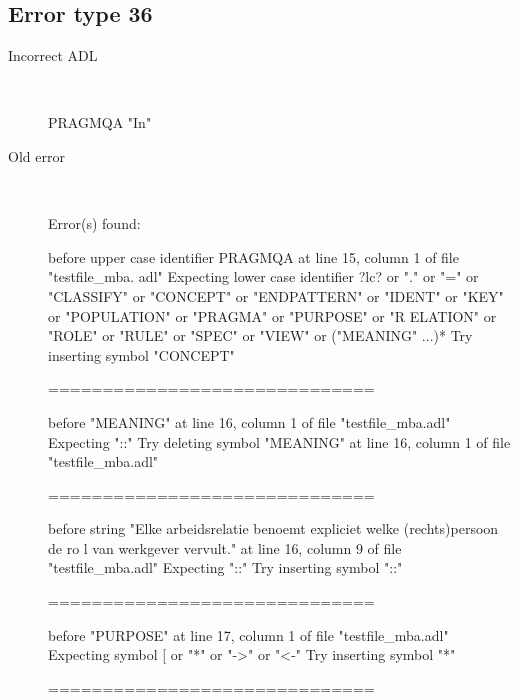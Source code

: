 \hrulefill

\subsection{Error type 36}
  \begin{description}
  \item[Incorrect ADL]~\\
\begin{adl}
PRAGMQA "In"\end{adl}
  \item[Old error]~\\
\begin{haskell}
Error(s) found:

before upper case identifier PRAGMQA at line 15, column 1 of file "testfile_mba.
adl"
Expecting lower case identifier ?lc? or "." or "=" or "CLASSIFY" or "CONCEPT" or
 "ENDPATTERN" or "IDENT" or "KEY" or "POPULATION" or "PRAGMA" or "PURPOSE" or "R
ELATION" or "ROLE" or "RULE" or "SPEC" or "VIEW" or ("MEANING" ...)*
Try inserting symbol "CONCEPT"

==============================

before "MEANING" at line 16, column 1 of file "testfile_mba.adl"
Expecting "::"
Try deleting symbol "MEANING" at line 16, column 1 of file "testfile_mba.adl"

==============================

before string "Elke arbeidsrelatie benoemt expliciet welke (rechts)persoon de ro
l van werkgever vervult." at line 16, column 9 of file "testfile_mba.adl"
Expecting "::"
Try inserting symbol "::"

==============================

before "PURPOSE" at line 17, column 1 of file "testfile_mba.adl"
Expecting symbol [ or "*" or "->" or "<-"
Try inserting symbol "*"

==============================


\end{haskell}
\end{description}
